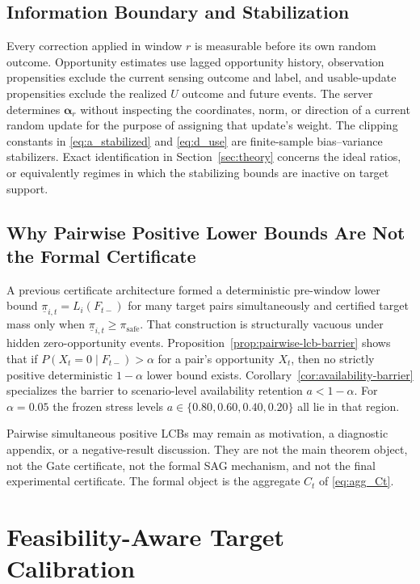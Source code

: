 \documentclass[letterpaper,journal]{IEEEtran}
\begin{document}
\subsection{Information Boundary and Stabilization}
\label{subsec:information_boundary}

Every correction applied in window $r$ is measurable before its own random
outcome.  Opportunity estimates use lagged opportunity history,
observation propensities exclude the current sensing outcome and label,
and usable-update propensities exclude the realized $U$ outcome and
future events.  The server determines $\boldsymbol\alpha_r$ without
inspecting the coordinates, norm, or direction of a current random
update for the purpose of assigning that update's weight.  The clipping
constants in \eqref{eq:a_stabilized} and \eqref{eq:d_use} are
finite-sample bias--variance stabilizers.  Exact identification in
Section~\ref{sec:theory} concerns the ideal ratios, or equivalently
regimes in which the stabilizing bounds are inactive on target support.

\subsection{Why Pairwise Positive Lower Bounds Are Not the Formal Certificate}
\label{subsec:pairwise_barrier}

A previous certificate architecture formed a deterministic pre-window lower
bound $\underline{\pi}_{i,t}=L_i(F_{t-})$ for many target pairs simultaneously
and certified target mass only when $\underline{\pi}_{i,t}\ge\pi_{\mathrm{safe}}$.
That construction is structurally vacuous under hidden zero-opportunity events.
Proposition~\ref{prop:pairwise-lcb-barrier} shows that if
$P(X_t=0\mid F_{t-})>\alpha$ for a pair's opportunity $X_t$, then no strictly
positive deterministic $1-\alpha$ lower bound exists.  Corollary~\ref{cor:availability-barrier}
specializes the barrier to scenario-level availability retention $a<1-\alpha$.
For $\alpha=0.05$ the frozen stress levels $a\in\{0.80,0.60,0.40,0.20\}$ all
lie in that region.

Pairwise simultaneous positive LCBs may remain as motivation, a diagnostic
appendix, or a negative-result discussion.  They are not the main theorem
object, not the Gate certificate, not the formal SAG mechanism, and not the
final experimental certificate.  The formal object is the aggregate $C_t$ of
\eqref{eq:agg_Ct}.


\section{Feasibility-Aware Target Calibration}
\label{sec:calibration}
\end{document}
